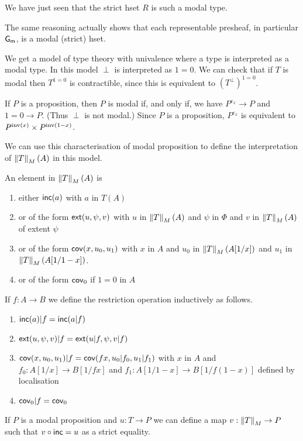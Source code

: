 \medskip

We have just seen that the strict hset $R$ is such a modal type.

The same reasoning actually shows that each representable presheaf, in particular $\mathsf{G_m}$, is a modal
(strict) hset.

\medskip

We get a model of type theory with univalence where a type is interpreted as a modal type.
In this model $\perp$ is interpreted as $1=0$. We can check that if $T$ is modal then
$T^{1=0}$ is contractible, since this is equivalent to $(T^{\perp})^{1=0}$.

\medskip

If $P$ is a proposition, then $P$ is modal if, and only if,
we have $P^{e_x}\rightarrow P$ and $1=0\rightarrow P$. (Thus $\perp$ is not modal.)
Since $P$ is a
proposition, $P^{e_x}$ is equivalent to $P^{\mathrm{inv}(x)}\times P^{\mathrm{inv}(1-x)}$.

\medskip

We can use this characterisation of modal proposition to define the interpretation of
$\left\lVert T \right\rVert_M(A)$ in this model.

An element in $\left\lVert T \right\rVert_M(A)$ is
\begin{enumerate}
\item either $\mathsf{inc}(a)$ with $a$ in $T(A)$
\item or of the form $\mathsf{ext}(u,\psi,v)$ with $u$ in $\left\lVert T \right\rVert_M(A)$ and $\psi$ in $\Phi$ and
  $v$ in $\left\lVert T \right\rVert_M(A)$ of extent $\psi$
\item or of the form $\mathsf{cov}(x,u_0,u_1)$ with $x$ in $A$ and $u_0$ in $\left\lVert T \right\rVert_M(A[1/x])$
  and $u_1$ in $\left\lVert T \right\rVert_M(A[1/1-x])$.
\item or of the form $\mathsf{cov}_0$ if $1 = 0$ in $A$  
\end{enumerate}

If $f:A\rightarrow B$ we define the restriction operation inductively as follows.
\begin{enumerate}
\item $\mathsf{inc}(a)|f = \mathsf{inc}(a|f)$
\item $\mathsf{ext}(u,\psi,v)|f = \mathsf{ext}(u|f,\psi,v|f)$
\item $\mathsf{cov}(x,u_0,u_1)|f = \mathsf{cov}(fx,u_0|f_0,u_1|f_1)$ with $x$ in $A$ 
 and $f_0:A[1/x]\rightarrow B[1/fx]$ and $f_1:A[1/1-x]\rightarrow B[1/f(1-x)]$ defined by localisation
\item $\mathsf{cov}_0|f = \mathsf{cov}_0$
\end{enumerate}

If $P$ is a modal proposition and $u:T\rightarrow P$ we can define a map $v:\left\lVert T \right\rVert_M\rightarrow P$
such that $v\circ\mathsf{inc} = u$ as a strict equality.

